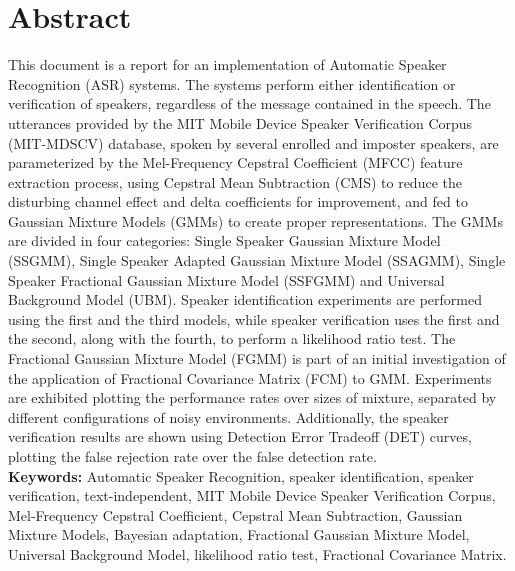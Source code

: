 \chapter*{Abstract}
\label{ch:abstract}

This document is a report for an implementation of Automatic Speaker Recognition (ASR) systems. The systems perform either identification or verification of speakers, regardless of the message contained in the speech. The utterances provided by the MIT Mobile Device Speaker Verification Corpus (MIT-MDSCV) database, spoken by several enrolled and imposter speakers, are parameterized by the Mel-Frequency Cepstral Coefficient (MFCC) feature extraction process, using Cepstral Mean Subtraction (CMS) to reduce the disturbing channel effect and delta coefficients for improvement, and fed to Gaussian Mixture Models (GMMs) to create proper representations. The GMMs are divided in four categories: Single Speaker Gaussian Mixture Model (SSGMM), Single Speaker Adapted Gaussian Mixture Model (SSAGMM), Single Speaker Fractional Gaussian Mixture Model (SSFGMM) and Universal Background Model (UBM). Speaker identification experiments are performed using the first and the third models, while speaker verification uses the first and the second, along with the fourth, to perform a likelihood ratio test. The Fractional Gaussian Mixture Model (FGMM) is part of an initial investigation of the application of Fractional Covariance Matrix (FCM) to GMM. Experiments are exhibited plotting the performance rates over sizes of mixture, separated by different configurations of noisy environments. Additionally, the speaker verification results are shown using Detection Error Tradeoff (DET) curves, plotting the false rejection rate over the false detection rate.
\\

\noindent \textbf{Keywords:} Automatic Speaker Recognition, speaker identification, speaker verification, text-independent, MIT Mobile Device Speaker Verification Corpus, Mel-Frequency Cepstral Coefficient, Cepstral Mean Subtraction, Gaussian Mixture Models, Bayesian adaptation, Fractional Gaussian Mixture Model, Universal Background Model, likelihood ratio test, Fractional Covariance Matrix.